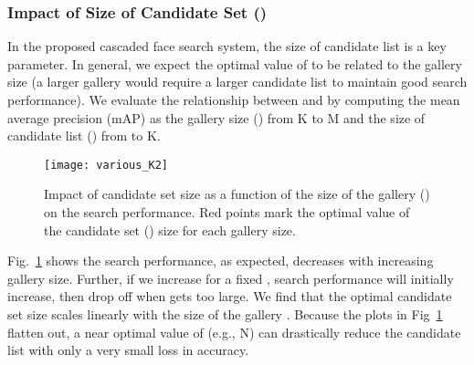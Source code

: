 \documentclass[10pt,journal,compsoc]{IEEEtran}
\begin{document}
\subsubsection{Impact of Size of Candidate Set ()}
In the proposed cascaded face search system, the size of candidate list  is a key parameter. In general, we expect the optimal value of  to be related to the gallery size  (a larger gallery would require a larger candidate list to maintain good search performance). We evaluate the relationship between  and  by computing the mean average precision (mAP) as the gallery size () from K to M and the size of candidate list () from  to K.
\begin{figure}[htbp]
\centering
  \texttt{[image: various\_K2]}
  \caption{Impact of candidate set size  as a function of the size of the gallery () on the search performance. Red points mark the optimal value of the candidate set () size for each gallery size.}\label{fig:exp_k}
\end{figure}

Fig.~\ref{fig:exp_k} shows the search performance, as expected, decreases with increasing gallery size. Further, if we increase  for a fixed , search performance will initially increase, then drop off when  gets too large.  We find that the optimal candidate set size  scales linearly with the size of the gallery . Because the plots in Fig~\ref{fig:exp_k} flatten out, a near optimal value of  (e.g., N) can drastically reduce the candidate list with only a very small loss in accuracy.
\end{document}
